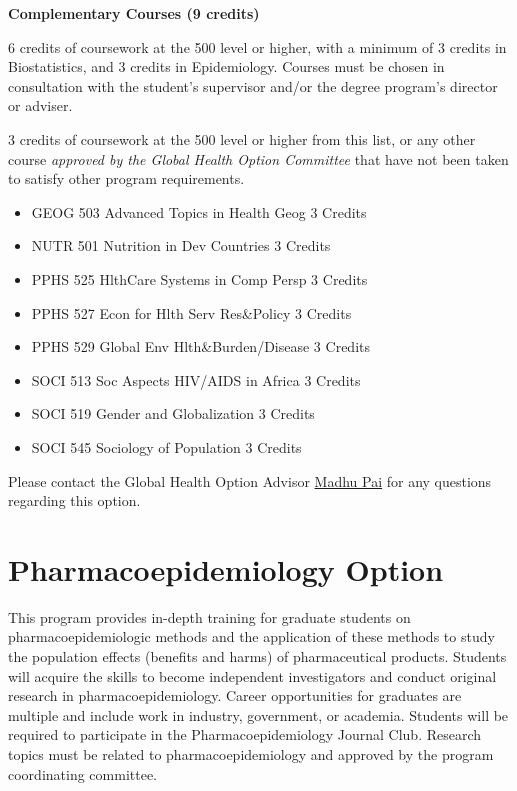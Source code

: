 \documentclass[
]{book}
\providecommand{\tightlist}{%
  \setlength{\itemsep}{0pt}\setlength{\parskip}{0pt}}
\begin{document}
\textbf{Complementary Courses (9 credits)}

6 credits of coursework at the 500 level or higher, with a minimum of 3 credits in Biostatistics, and 3 credits in Epidemiology. Courses must be chosen in consultation with the student's supervisor and/or the degree program's director or adviser.

3 credits of coursework at the 500 level or higher from this list, or any other course \emph{approved by the Global Health Option Committee} that have not been taken to satisfy other program requirements.

\begin{itemize}
\tightlist
\item
  GEOG 503 Advanced Topics in Health Geog 3 Credits
\item
  NUTR 501 Nutrition in Dev Countries 3 Credits
\item
  PPHS 525 HlthCare Systems in Comp Persp 3 Credits
\item
  PPHS 527 Econ for Hlth Serv Res\&Policy 3 Credits
\item
  PPHS 529 Global Env Hlth\&Burden/Disease 3 Credits
\item
  SOCI 513 Soc Aspects HIV/AIDS in Africa 3 Credits
\item
  SOCI 519 Gender and Globalization 3 Credits
\item
  SOCI 545 Sociology of Population 3 Credits
\end{itemize}

Please contact the Global Health Option Advisor \href{mailto:madhukar.pai@mcgill.ca}{Madhu Pai} for any questions regarding this option.

\hypertarget{pharmacoepidemiology-option}{%
\section{Pharmacoepidemiology Option}\label{pharmacoepidemiology-option}}

This program provides in-depth training for graduate students on pharmacoepidemiologic methods and the application of these methods to study the population effects (benefits and harms) of pharmaceutical products. Students will acquire the skills to become independent investigators and conduct original research in pharmacoepidemiology. Career opportunities for graduates are multiple and include work in industry, government, or academia. Students will be required to participate in the Pharmacoepidemiology Journal Club. Research topics must be related to pharmacoepidemiology and approved by the program coordinating committee.
\end{document}
